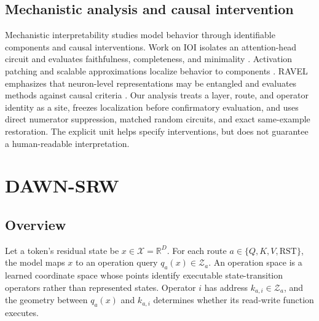 \documentclass{article}
\newcommand{\R}{\mathbb{R}}
\begin{document}
\subsection{Mechanistic analysis and causal intervention}

Mechanistic interpretability studies model behavior through identifiable
components and causal interventions. Work on IOI isolates an attention-head
circuit and evaluates faithfulness, completeness, and minimality
\cite{wang2023interpretability}. Activation patching and scalable
approximations localize behavior to components
\cite{kramar2024atp}. RAVEL emphasizes that neuron-level representations may
be entangled and evaluates methods against causal criteria
\cite{huang2024ravel}. Our analysis treats a layer, route, and operator
identity as a site, freezes localization before confirmatory evaluation, and
uses direct numerator suppression, matched random circuits, and exact
same-example restoration. The explicit unit helps specify interventions, but
does not guarantee a human-readable interpretation.

\section{DAWN-SRW}
\label{sec:method}

\subsection{Overview}

Let a token's residual state be \(x\in\mathcal{X}=\R^D\). For each route
\(a\in\{Q,K,V,\mathrm{RST}\}\), the model maps \(x\) to an operation query
\(q_a(x)\in\mathcal{Z}_a\). An operation space is a learned coordinate space
whose points identify executable state-transition operators rather than
represented states. Operator \(i\) has address \(k_{a,i}\in\mathcal{Z}_a\),
and the geometry between \(q_a(x)\) and \(k_{a,i}\) determines whether its
read-write function executes.
\end{document}

